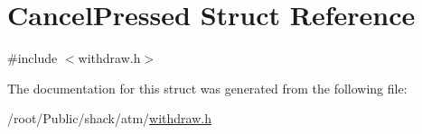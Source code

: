 \hypertarget{structCancelPressed}{\section{Cancel\-Pressed Struct Reference}
\label{structCancelPressed}
}


{\ttfamily \#include $<$withdraw.\-h$>$}



The documentation for this struct was generated from the following file\-:\begin{DoxyCompactItemize}
\item 
/root/\-Public/shack/atm/\hyperlink{withdraw_8h}{withdraw.\-h}\end{DoxyCompactItemize}
